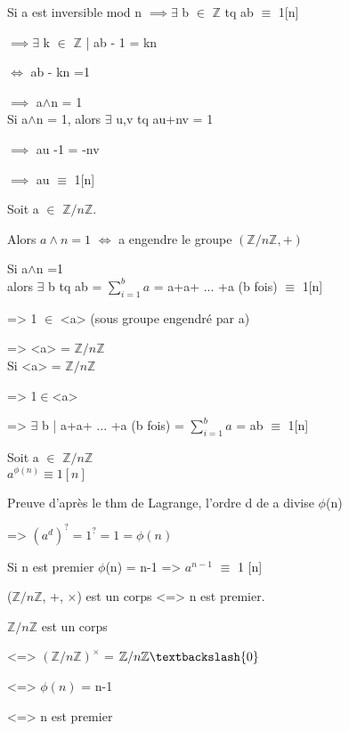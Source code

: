 \begin{dem}
	Si a est inversible mod n $\implies \exists$ b $\in$ $\mathbb{Z}$ tq ab $\equiv$ 1[n]
	
			 $\implies \exists$ k $\in$ $\mathbb{Z}$ | ab - 1 = kn
			
			$\iff$ ab - kn =1
			
			$\implies$ a$\wedge$n = 1\\
	Si a$\wedge$n = 1, alors $\exists$ u,v tq au+nv = 1
	
	$\implies$ au -1 = -nv
	
	$\implies$ au $\equiv$ 1[n]
\end{dem}
\begin{prop}
	Soit a $\in$ $\mathbb{Z}/n\mathbb{Z}$.
	
	Alors $a\wedge n = 1$ $\iff$ a engendre le groupe $(\mathbb{Z}/n\mathbb{Z}, +)$
\end{prop}
\begin{dem}
	Si a$\wedge$n =1\\
	alors $\exists$ b tq ab = $\sum_{i=1}^{b} a$ = a+a+ ... +a (b fois) $\equiv$ 1[n]
	
	=> 1 $\in$ <a> (sous groupe engendré par a)
	
	=> <a> = $\mathbb{Z}/n\mathbb{Z}$\\
	Si <a> = $\mathbb{Z}/n\mathbb{Z}$
	
	=> 1$\in$<a>
	
	=> $\exists$ b | a+a+ ... +a (b fois) = $\sum_{i=1}^{b} a$ = ab $\equiv$ 1[n]
	
\end{dem}
\begin{cor}
	Soit a $\in$ $\mathbb{Z}/n\mathbb{Z}$\\
		$a^{\phi(n)} \equiv 1[n]$
\end{cor}
\begin{dem}
	Preuve d'après le thm de Lagrange, l'ordre d de a divise $\phi$(n) 
	
	=> $(a^{d})^{?} = 1^{?} = 1 = \phi(n)$
\end{dem}
\begin{rem}
	Si n est premier $\phi$(n) = n-1
	=> $a^{n-1}$ $\equiv$ 1 [n]
\end{rem}
\begin{cor}
	($\mathbb{Z}/n\mathbb{Z}$, +, $\times$) est un corps <=> n est premier.
\end{cor}
\begin{dem}
	$\mathbb{Z}/n\mathbb{Z}$ est un corps
	
	<=> $(\mathbb{Z}/n\mathbb{Z})^{\times}$ = $\mathbb{Z}/n\mathbb{Z}\textbackslash\{0\}$
	
	<=> $\phi(n)$ = n-1
	
	<=> n est premier
\end{dem}
